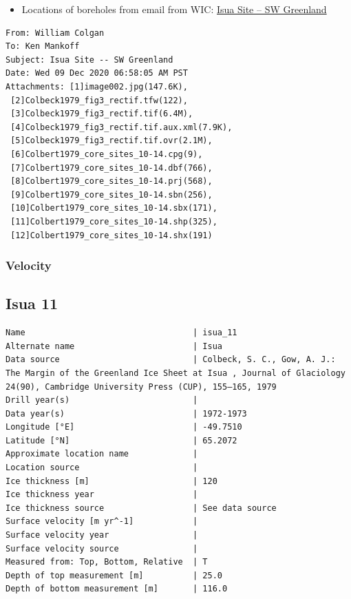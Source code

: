 \documentclass[article,a4paper,times,11pt,twoside]{article}
\begin{document}
\begin{itemize}
\item Locations of boreholes from email from WIC: \href{msgid:AM0PR04MB6129F131ECD9123E72752945A2CC0@AM0PR04MB6129.eurprd04.prod.outlook.com}{Isua Site -- SW Greenland}
\end{itemize}

\begin{verbatim}
From: William Colgan
To: Ken Mankoff
Subject: Isua Site -- SW Greenland
Date: Wed 09 Dec 2020 06:58:05 AM PST
Attachments: [1]image002.jpg(147.6K),
 [2]Colbeck1979_fig3_rectif.tfw(122),
 [3]Colbeck1979_fig3_rectif.tif(6.4M),
 [4]Colbeck1979_fig3_rectif.tif.aux.xml(7.9K),
 [5]Colbeck1979_fig3_rectif.tif.ovr(2.1M),
 [6]Colbert1979_core_sites_10-14.cpg(9),
 [7]Colbert1979_core_sites_10-14.dbf(766),
 [8]Colbert1979_core_sites_10-14.prj(568),
 [9]Colbert1979_core_sites_10-14.sbn(256),
 [10]Colbert1979_core_sites_10-14.sbx(171),
 [11]Colbert1979_core_sites_10-14.shp(325),
 [12]Colbert1979_core_sites_10-14.shx(191)
\end{verbatim}

\subsubsection{Velocity}
\label{sec:org8066287}
\clearpage
\subsection{Isua 11}
\label{sec:org559557e}
\begin{verbatim}
Name                                  | isua_11
Alternate name                        | Isua
Data source                           | Colbeck, S. C., Gow, A. J.: The Margin of the Greenland Ice Sheet at Isua , Journal of Glaciology 24(90), Cambridge University Press (CUP), 155–165, 1979 
Drill year(s)                         | 
Data year(s)                          | 1972-1973
Longitude [°E]                        | -49.7510
Latitude [°N]                         | 65.2072
Approximate location name             | 
Location source                       | 
Ice thickness [m]                     | 120
Ice thickness year                    | 
Ice thickness source                  | See data source
Surface velocity [m yr^-1]            | 
Surface velocity year                 | 
Surface velocity source               | 
Measured from: Top, Bottom, Relative  | T
Depth of top measurement [m]          | 25.0
Depth of bottom measurement [m]       | 116.0
\end{verbatim}
\end{document}
